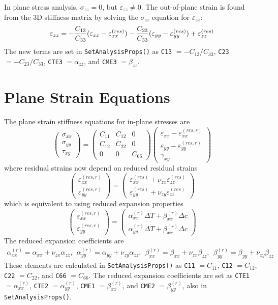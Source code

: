 \documentclass[11pt]{book}
\def\a#1{\alpha_{#1}}
\def\b#1{\beta_{#1}}
\def\code#1{{\small\tt #1}}
\def\DT{\Delta T}
\def\e#1{\varepsilon_{#1}}
\def\er#1{\varepsilon_{#1}^{(res)}}
\def\err#1{\varepsilon_{#1}^{(res,r)}}
\def\g#1{\gamma_{#1}}
\def\s#1{\sigma_{#1}}
\def\symmat#1#2#3#4#5#6{\left(\begin{array}{ccc} #1 & #2 & #3 \\ #2 & #4 & #5 \\
                                                      #3 & #5 & #6 \end{array}\right)}
\def\t#1{\tau_{#1}}
\def\v#1{\nu_{#1}}
\def\vvec#1#2#3{\left(\begin{array}{ccc} #1 \\ #2 \\ #3 \end{array}\right)}
\begin{document}
In plane stress analysis, $\s{zz}=0$, but $\e{zz}\ne0$. The out-of-plane strain is found from the 3D stiffness matrix by solving the $\s{zz}$ equation for $\e{zz}$:
\begin{equation}
            \e{zz} = -{C_{13}\over C_{33}}(\e{xx} -\er{xx}) - {C_{23}\over C_{33}}(\e{yy} -\er{yy}) 
                     + \er{zz}
\end{equation}
The new terms are set in \code{SetAnalysisProps()} as \code{C13} $=-C_{13}/C_{33}$, \code{C23} $=-C_{23}/C_{33}$, \code{CTE3} $=\a{zz}$, and \code{CME3} $=\b{zz}$.

\section{Plane Strain Equations}

The plane strain stiffness equations for in-plane stresses are
\begin{equation}
      \vvec{\s{xx}}{\s{yy}}{\t{xy}} = \symmat{C_{11}}{C_{12}}{0}{C_{22}}{0}{C_{66}}
          \vvec{\e{xx} -\err{xx}}{\e{yy} - \err{yy}}{\g{xy}}
 \end{equation}
 where residual strains now depend on reduced residual strains
\begin{equation}
\left(\begin{array}{c} \err{xx} \\ \err{yy}  \end{array}\right)
       =  \left(\begin{array}{c}
	 \er{xx} + \v{zx}\er{zz} \\
	\er{yy} + \v{zy}\er{zz} \end{array}\right)
\end{equation}
which is equivalent to using reduced expansion properties
\begin{equation}
\left(\begin{array}{c} \err{xx} \\ \err{yy}  \end{array}\right)
       =  \left(\begin{array}{c}
	 \a{xx}^{(r)}\DT + \b{xx}^{(r)}\Delta c \\
	\a{yy}^{(r)}\DT + \b{xx}^{(r)}\Delta c \end{array}\right)
\end{equation}
The reduced expansion coefficients are
\begin{eqnarray}%
   \a{xx}^{(r)} = \a{xx} + \v{zx}\a{zz}, \ \ 
   \a{yy}^{(r)} = \a{yy} + \v{zy}\a{zz}, \ \ 
   \b{xx}^{(r)} = \b{xx} + \v{zx}\b{zz}, \ \ 
   \b{yy}^{(r)} = \b{yy} + \v{zy}\b{zz}
\end{eqnarray}%
These elements are calculated in \code{SetAnalysisProps()} as \code{C11} $=C_{11}$, \code{C12}  $=C_{12}$, \code{C22} $=C_{22}$, and \code{C66} $=C_{66}$. The reduced expansion coefficients are set as \code{CTE1} $=\a{xx}^{(r)}$, \code{CTE2} $=\a{yy}^{(r)}$, \code{CME1} $=\b{xx}^{(r)}$, and \code{CME2} $=\b{yy}^{(r)}$, also in \code{SetAnalysisProps()}.
\end{document}
